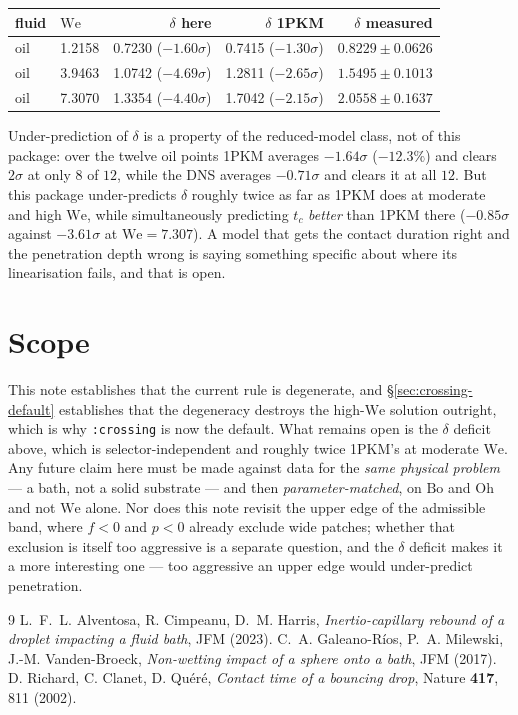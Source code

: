 \documentclass[11pt]{article}
\newcommand{\Oh}{\mathrm{Oh}}
\newcommand{\We}{\mathrm{We}}
\newcommand{\Bo}{\mathrm{Bo}}
\begin{document}
\begin{center}
\begin{tabular}{llrrr}
\hline
fluid & $\We$ & $\delta$ here & $\delta$ 1PKM & $\delta$ measured \\
\hline
oil & 1.2158 & 0.7230 ($-1.60\sigma$) & 0.7415 ($-1.30\sigma$) & $0.8229\pm0.0626$ \\
oil & 3.9463 & 1.0742 ($-4.69\sigma$) & 1.2811 ($-2.65\sigma$) & $1.5495\pm0.1013$ \\
oil & 7.3070 & 1.3354 ($-4.40\sigma$) & 1.7042 ($-2.15\sigma$) & $2.0558\pm0.1637$ \\
\hline
\end{tabular}
\end{center}

Under-prediction of $\delta$ is a property of the reduced-model class, not of this package: over the
twelve oil points 1PKM averages $-1.64\sigma$ ($-12.3\%$) and clears $2\sigma$ at only $8$ of $12$,
while the DNS averages $-0.71\sigma$ and clears it at all $12$. But this package under-predicts
$\delta$ roughly twice as far as 1PKM does at moderate and high $\We$, while simultaneously
predicting $t_c$ \emph{better} than 1PKM there ($-0.85\sigma$ against $-3.61\sigma$ at
$\We=7.307$). A model that gets the contact duration right and the penetration depth wrong is
saying something specific about where its linearisation fails, and that is open.

\section{Scope}

This note establishes that the current rule is degenerate, and \S\ref{sec:crossing-default}
establishes that the degeneracy destroys the high-$\We$ solution outright, which is why
\texttt{:crossing} is now the default. What remains open is the $\delta$ deficit above, which is
selector-independent and roughly twice 1PKM's at moderate $\We$. Any future claim here must be made
against data for the \emph{same physical problem} --- a bath, not a solid substrate --- and then
\emph{parameter-matched}, on $\Bo$ and $\Oh$ and not $\We$ alone. Nor does this note
revisit the upper edge of the admissible band, where $f<0$ and $p<0$ already exclude wide patches;
whether that exclusion is itself too aggressive is a separate question, and the $\delta$ deficit
makes it a more interesting one --- too aggressive an upper edge would under-predict penetration.

\begin{thebibliography}{9}
 L.~F.~L. Alventosa, R. Cimpeanu, D.~M. Harris,
  \emph{Inertio-capillary rebound of a droplet impacting a fluid bath}, JFM (2023).
 C.~A. Galeano-R\'ios, P.~A. Milewski, J.-M. Vanden-Broeck,
  \emph{Non-wetting impact of a sphere onto a bath}, JFM (2017).
 D. Richard, C. Clanet, D. Qu\'er\'e,
  \emph{Contact time of a bouncing drop}, Nature \textbf{417}, 811 (2002).
\end{thebibliography}
\end{document}
